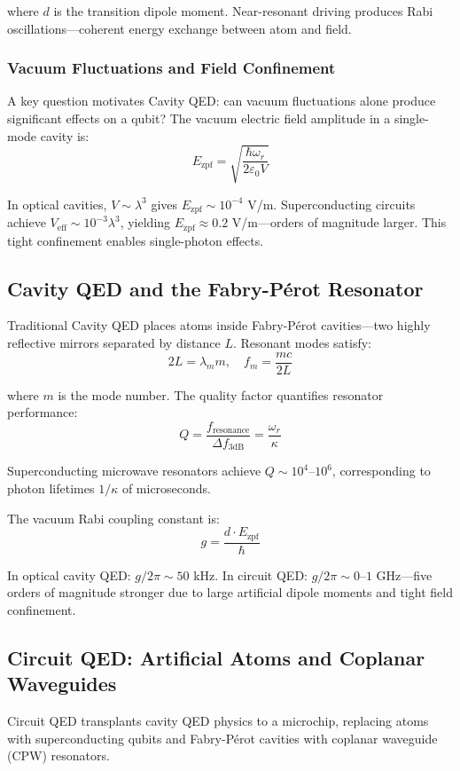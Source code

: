 \documentclass{article}
\begin{document}
where $d$ is the transition dipole moment. Near-resonant driving produces Rabi oscillations—coherent energy exchange between atom and field.

\subsubsection*{Vacuum Fluctuations and Field Confinement}

A key question motivates Cavity QED: can vacuum fluctuations alone produce significant effects on a qubit? The vacuum electric field amplitude in a single-mode cavity is:
$$E_{\text{zpf}} = \sqrt{\frac{\hbar\omega_r}{2\varepsilon_0 V}}$$

In optical cavities, $V \sim \lambda^3$ gives $E_{\text{zpf}} \sim 10^{-4}$ V/m. Superconducting circuits achieve $V_{\text{eff}} \sim 10^{-3}\lambda^3$, yielding $E_{\text{zpf}} \approx 0.2$ V/m—orders of magnitude larger. This tight confinement enables single-photon effects.

\subsection{Cavity QED and the Fabry-Pérot Resonator}

Traditional Cavity QED places atoms inside Fabry-Pérot cavities—two highly reflective mirrors separated by distance $L$. Resonant modes satisfy:
$$2L = \lambda_m m, \quad f_m = \frac{mc}{2L}$$

where $m$ is the mode number. The quality factor quantifies resonator performance:
$$Q = \frac{f_{\text{resonance}}}{\Delta f_{3\text{dB}}} = \frac{\omega_r}{\kappa}$$

Superconducting microwave resonators achieve $Q \sim 10^4$--$10^6$, corresponding to photon lifetimes $1/\kappa$ of microseconds.

The vacuum Rabi coupling constant is:
$$g = \frac{d \cdot E_{\text{zpf}}}{\hbar}$$

In optical cavity QED: $g/2\pi \sim 50$ kHz. In circuit QED: $g/2\pi \sim 0$--$1$ GHz—five orders of magnitude stronger due to large artificial dipole moments and tight field confinement.

\subsection{Circuit QED: Artificial Atoms and Coplanar Waveguides}

Circuit QED transplants cavity QED physics to a microchip, replacing atoms with superconducting qubits and Fabry-Pérot cavities with coplanar waveguide (CPW) resonators.
\end{document}
